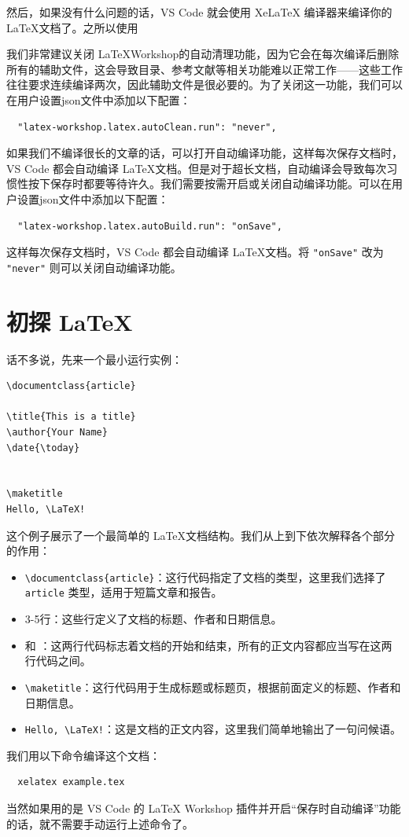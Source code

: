 然后，如果没有什么问题的话，VS Code 就会使用 XeLaTeX 编译器来编译你的 \LaTeX 文档了。之所以使用

我们非常建议关闭 \LaTeX Workshop的自动清理功能，因为它会在每次编译后删除所有的辅助文件，这会导致目录、参考文献等相关功能难以正常工作——这些工作往往要求连续编译两次，因此辅助文件是很必要的。为了关闭这一功能，我们可以在用户设置json文件中添加以下配置：
\begin{verbatim}
  "latex-workshop.latex.autoClean.run": "never",
\end{verbatim}

如果我们不编译很长的文章的话，可以打开自动编译功能，这样每次保存文档时，VS Code 都会自动编译 \LaTeX 文档。但是对于超长文档，自动编译会导致每次习惯性按下保存时都要等待许久。我们需要按需开启或关闭自动编译功能。可以在用户设置json文件中添加以下配置：
\begin{verbatim}
  "latex-workshop.latex.autoBuild.run": "onSave",
\end{verbatim}
这样每次保存文档时，VS Code 都会自动编译 \LaTeX 文档。将 \verb|"onSave"| 改为 \verb|"never"| 则可以关闭自动编译功能。

\section{初探 \LaTeX}

话不多说，先来一个最小运行实例：
\begin{verbatim}
\documentclass{article}

\title{This is a title}
\author{Your Name}
\date{\today}


\maketitle
Hello, \LaTeX!

\end{verbatim}

这个例子展示了一个最简单的 \LaTeX 文档结构。我们从上到下依次解释各个部分的作用：
\begin{itemize}
  \item \verb|\documentclass{article}|：这行代码指定了文档的类型，这里我们选择了 \verb|article| 类型，适用于短篇文章和报告。
  \item 3-5行：这些行定义了文档的标题、作者和日期信息。
  \item \verb|| 和 \verb||：这两行代码标志着文档的开始和结束，所有的正文内容都应当写在这两行代码之间。
  \item \verb|\maketitle|：这行代码用于生成标题或标题页，根据前面定义的标题、作者和日期信息。
  \item \verb|Hello, \LaTeX!|：这是文档的正文内容，这里我们简单地输出了一句问候语。
\end{itemize}
我们用以下命令编译这个文档：
\begin{verbatim}
  xelatex example.tex
\end{verbatim}
当然如果用的是 VS Code 的 LaTeX Workshop 插件并开启“保存时自动编译”功能的话，就不需要手动运行上述命令了。

